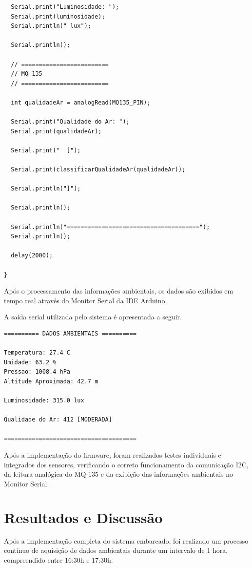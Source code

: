 \documentclass[a4paper,12pt]{article}
\begin{document}
\begin{verbatim}
  Serial.print("Luminosidade: ");
  Serial.print(luminosidade);
  Serial.println(" lux");

  Serial.println();

  // =========================
  // MQ-135
  // =========================

  int qualidadeAr = analogRead(MQ135_PIN);

  Serial.print("Qualidade do Ar: ");
  Serial.print(qualidadeAr);

  Serial.print("  [");

  Serial.print(classificarQualidadeAr(qualidadeAr));

  Serial.println("]");

  Serial.println();

  Serial.println("======================================");
  Serial.println();

  delay(2000);

}
\end{verbatim}

Após o processamento das informações ambientais, os dados são exibidos em tempo real através do Monitor Serial da IDE Arduino.

A saída serial utilizada pelo sistema é apresentada a seguir.

\begin{verbatim}
========== DADOS AMBIENTAIS ==========

Temperatura: 27.4 C
Umidade: 63.2 %
Pressao: 1008.4 hPa
Altitude Aproximada: 42.7 m

Luminosidade: 315.0 lux

Qualidade do Ar: 412 [MODERADA]

======================================
\end{verbatim}

Após a implementação do firmware, foram realizados testes individuais e integrados dos sensores, verificando o correto funcionamento da comunicação I2C, da leitura analógica do MQ-135 e da exibição das informações ambientais no Monitor Serial.

\section{Resultados e Discussão}

Após a implementação completa do sistema embarcado, foi realizado um processo contínuo de aquisição de dados ambientais durante um intervalo de 1 hora, compreendido entre 16:30h e 17:30h.
\end{document}
